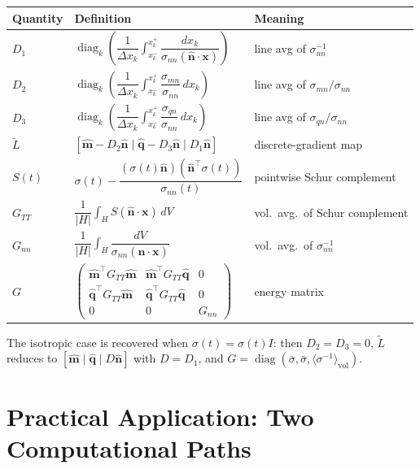 \documentclass[11pt]{article}
\newcommand{\nn}{\hat{\bm{n}}}
\newcommand{\mm}{\hat{\bm{m}}}
\newcommand{\qq}{\hat{\bm{q}}}
\newcommand{\tL}{\widetilde{L}}
\newcommand{\sbar}{\bar{\sigma}}
\newcommand{\invs}{\langle\sigma^{-1}\rangle_{\mathrm{vol}}}
\newcommand{\GTT}{G_{TT}}
\newcommand{\Gnn}{G_{nn}}
\begin{document}
\medskip
\begin{center}
\renewcommand{\arraystretch}{1.8}
\begin{tabular}{lll}
\toprule
Quantity & Definition & Meaning \\
\midrule
$D_1$ & $\operatorname{diag}_k\!\left(\dfrac{1}{\Delta x_k}
        \displaystyle\int_{x_k^-}^{x_k^+}
        \dfrac{dx_k}{\sigma_{nn}(\nn\cdot\bm{x})}\right)$
      & line avg of $\sigma_{nn}^{-1}$ \\[6pt]
$D_2$ & $\operatorname{diag}_k\!\left(\dfrac{1}{\Delta x_k}
        \displaystyle\int_{x_k^-}^{x_k^+}
        \dfrac{\sigma_{mn}}{\sigma_{nn}}\,dx_k\right)$
      & line avg of $\sigma_{mn}/\sigma_{nn}$ \\[6pt]
$D_3$ & $\operatorname{diag}_k\!\left(\dfrac{1}{\Delta x_k}
        \displaystyle\int_{x_k^-}^{x_k^+}
        \dfrac{\sigma_{qn}}{\sigma_{nn}}\,dx_k\right)$
      & line avg of $\sigma_{qn}/\sigma_{nn}$ \\[6pt]
$\tL$ & $[\mm - D_2\nn \mid \qq - D_3\nn \mid D_1\nn]$
      & discrete-gradient map \\[2pt]
$S(t)$ & $\sigma(t) - \dfrac{(\sigma(t)\nn)(\nn^\top\!\sigma(t))}{\sigma_{nn}(t)}$
       & pointwise Schur complement \\[6pt]
$\GTT$ & $\dfrac{1}{|H|}\displaystyle\int_H S(\nn\cdot\bm{x})\,dV$
       & vol.\ avg.\ of Schur complement \\[6pt]
$\Gnn$ & $\dfrac{1}{|H|}\displaystyle\int_H \dfrac{dV}{\sigma_{nn}(\nn\cdot\bm{x})}$
       & vol.\ avg.\ of $\sigma_{nn}^{-1}$ \\[6pt]
$G$ & $\begin{pmatrix} \mm^\top\!\GTT\mm & \mm^\top\!\GTT\qq & 0 \\
                       \qq^\top\!\GTT\mm & \qq^\top\!\GTT\qq & 0 \\
                       0 & 0 & \Gnn \end{pmatrix}$
    & energy matrix \\
\bottomrule
\end{tabular}
\end{center}

\medskip\noindent
The isotropic case is recovered when $\sigma(t) = \sigma(t)I$: then
$D_2 = D_3 = 0$, $\tL$ reduces to $[\mm\mid\qq\mid D\nn]$ with
$D = D_1$, and $G = \operatorname{diag}(\sbar,\sbar,\invs)$.

\section{Practical Application: Two Computational Paths}
\end{document}
